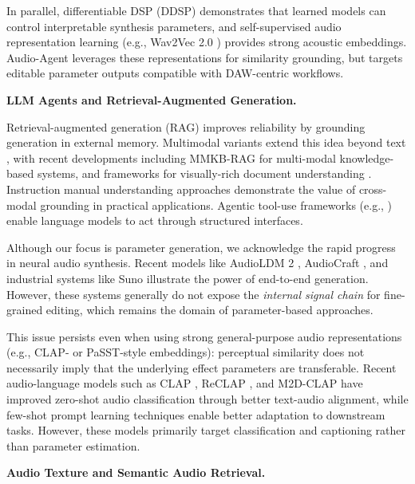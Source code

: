 \documentclass{article}
\begin{document}
In parallel, differentiable DSP (DDSP) \citep{engel2020ddsp} demonstrates that learned models can control interpretable synthesis parameters, and self-supervised audio representation learning (e.g., Wav2Vec 2.0 \citep{baevski2020wav2vec}) provides strong acoustic embeddings. Audio-Agent leverages these representations for similarity grounding, but targets editable parameter outputs compatible with DAW-centric workflows.

\noindent\textbf{LLM Agents and Retrieval-Augmented Generation.}

Retrieval-augmented generation (RAG) \citep{lewis2020rag} improves reliability by grounding generation in external memory. Multimodal variants extend this idea beyond text \citep{yasunaga2023retrieval,liu2025hmrag}, with recent developments including MMKB-RAG \citep{zayats2024mmkb} for multi-modal knowledge-based systems, and frameworks for visually-rich document understanding \citep{jin2024mrag}. Instruction manual understanding approaches \citep{jin2024multimodal} demonstrate the value of cross-modal grounding in practical applications. Agentic tool-use frameworks (e.g., \citep{schick2023toolformer,yao2023react,sun2024toolgen}) enable language models to act through structured interfaces.

Although our focus is parameter generation, we acknowledge the rapid progress in neural audio synthesis. Recent models like AudioLDM 2 \citep{liu2024audioldm2}, AudioCraft \citep{copet2023audiocraft}, and industrial systems like Suno illustrate the power of end-to-end generation. However, these systems generally do not expose the \textit{internal signal chain} for fine-grained editing, which remains the domain of parameter-based approaches.

This issue persists even when using strong general-purpose audio representations (e.g., CLAP- or PaSST-style embeddings): perceptual similarity does not necessarily imply that the underlying effect parameters are transferable. Recent audio-language models such as CLAP \citep{elizalde2023clap}, ReCLAP \citep{chen2024reclap}, and M2D-CLAP \citep{niizumi2024m2dclap} have improved zero-shot audio classification through better text-audio alignment, while few-shot prompt learning techniques \citep{wu2024fewshot} enable better adaptation to downstream tasks. However, these models primarily target classification and captioning rather than parameter estimation.

\noindent\textbf{Audio Texture and Semantic Audio Retrieval.}
\end{document}
